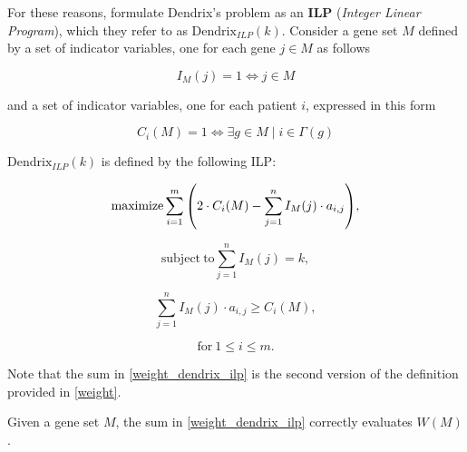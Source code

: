 For these reasons, \textcite{multi-dendrix} formulate Dendrix's problem as an \textbf{ILP} (\textit{Integer Linear Program}), which they refer to as $\mathrm{Dendrix}_{\mathrm{\textit{ILP}}}(k)$. Consider a gene set $M$ defined by a set of indicator variables, one for each gene $j \in M$ as follows

\begin{equation}
    I_M(j) = 1 \iff j \in M
\end{equation}

and a set of indicator variables, one for each patient $i$, expressed in this form

\begin{equation} \label{c_idefn}
    C_i(M) = 1 \iff \exists g \in M \mid i \in \Gamma(g)
\end{equation}

\begin{definition}
    $\mathrm{Dendrix}_{\mathrm{\textit{ILP}}}(k)$ is defined by the following ILP:

    \begin{equation} \label{weight_dendrix_ilp}
        \mathrm{maximize} \sum_{i = 1}^m {\left(2 \cdot C_i(M) - \sum_{j = 1}^n I_M(j) \cdot a_{i, j}\right)},
    \end{equation}

    \begin{equation} \label{second_constr_dendrix_ilp}
        \mathrm{subject \ to} \sum_{j = 1}^n{I_M(j) = k},
    \end{equation}

    \begin{equation} \label{third_constr_dendrix_ilp}
        \sum_{j = 1}^n I_M(j) \cdot {a_{i, j}} \ge C_i(M),
    \end{equation}

    \begin{equation*}
        \mathrm{for\ } 1 \le i \le m.
    \end{equation*}
\end{definition}

Note that the sum in \cref{weight_dendrix_ilp} is the second version of the definition provided in \cref{weight}.

\begin{lemma} Given a gene set $M$, the sum in \cref{weight_dendrix_ilp} correctly evaluates $W(M)$.
\end{lemma}

